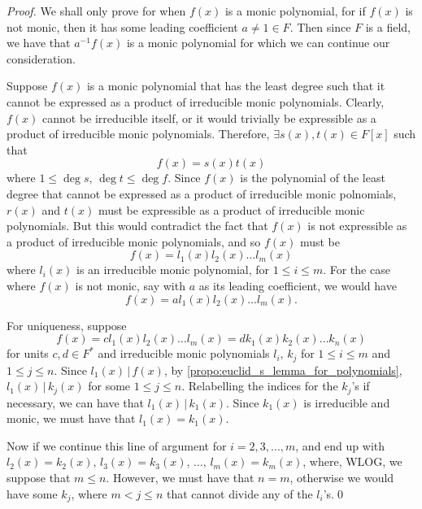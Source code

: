 \begin{proof}
  We shall only prove for when $f(x)$ is a monic polynomial, for if $f(x)$ is not monic, then it has some leading coefficient $a \neq 1 \in F$. Then since $F$ is a field, we have that $a^{-1} f(x)$ is a monic polynomial for which we can continue our consideration.

  Suppose $f(x)$ is a monic polynomial that has the least degree such that it cannot be expressed as a product of irreducible monic polynomials. Clearly, $f(x)$ cannot be irreducible itself, or it would trivially be expressible as a product of irreducible monic polynomials. Therefore, $\exists s(x), t(x) \in F[x]$ such that
  \begin{equation*}
    f(x) = s(x) t(x)
  \end{equation*}
  where $1 \leq \deg s, \, \deg t \leq \deg f$. Since $f(x)$ is the polynomial of the least degree that cannot be expressed as a product of irreducible monic polnomials, $r(x)$ and $t(x)$ must be expressible as a product of irreducible monic polynomials. But this would contradict the fact that $f(x)$ is not expressible as a product of irreducible monic polynomials, and so $f(x)$ must be
  \begin{equation*}
    f(x) = l_1(x) l_2(x) \hdots l_m(x)
  \end{equation*}
  where $l_i(x)$ is an irreducible monic polynomial, for $1 \leq i \leq m$. For the case where $f(x)$ is not monic, say with $a$ as its leading coefficient, we would have
  \begin{equation*}
    f(x) = a l_1(x) l_2(x) \hdots l_m(x).
  \end{equation*}

  For uniqueness, suppose
  \begin{equation*}
    f(x) = c l_1(x) l_2(x) \hdots l_m(x) = d k_1(x) k_2(x) \hdots k_n(x)
  \end{equation*}
  for units $c, d \in F^*$ and irreducible monic polynomials $l_i, \, k_j$ for $1 \leq i \leq m$ and $1 \leq j \leq n$. Since $l_1(x) \, | \, f(x)$, by \cref{propo:euclid_s_lemma_for_polynomials}, $l_1(x) \, | \, k_j(x)$ for some $1 \leq j \leq n$. Relabelling the indices for the $k_j$'s if necessary, we can have that $l_1(x) \, | \, k_1(x)$. Since $k_1(x)$ is irreducible and monic, we must have that $l_1(x) = k_1(x)$.

  Now if we continue this line of argument for $i = 2, 3, ..., m$, and end up with $l_2(x) = k_2(x), \, l_3(x) = k_3(x), \, \hdots , \, l_m(x) = k_m(x)$, where, WLOG, we suppose that $m \leq n$. However, we must have that $n = m$, otherwise we would have some $k_j$, where $m < j \leq n$ that cannot divide any of the $l_i$'s.\qed
\end{proof}


